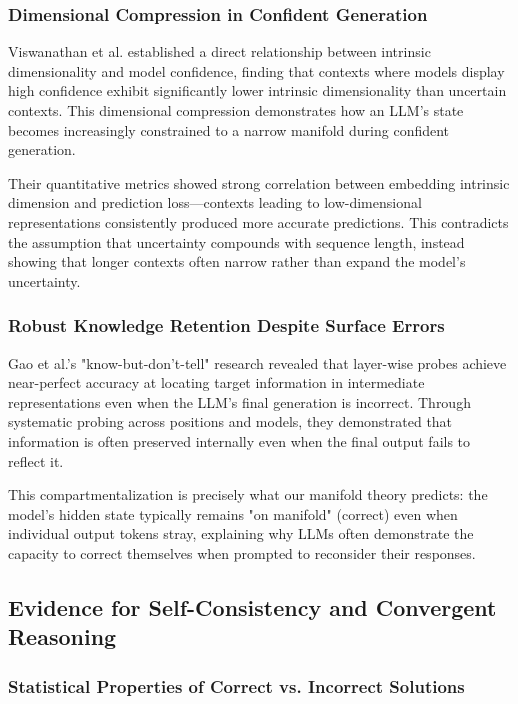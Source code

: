 \documentclass{article}
\begin{document}
\subsubsection{Dimensional Compression in Confident Generation}

Viswanathan et al. \citep{viswanathan2023geometry} established a direct relationship between intrinsic dimensionality and model confidence, finding that contexts where models display high confidence exhibit significantly lower intrinsic dimensionality than uncertain contexts. This dimensional compression demonstrates how an LLM's state becomes increasingly constrained to a narrow manifold during confident generation.

Their quantitative metrics showed strong correlation between embedding intrinsic dimension and prediction loss—contexts leading to low-dimensional representations consistently produced more accurate predictions. This contradicts the assumption that uncertainty compounds with sequence length, instead showing that longer contexts often narrow rather than expand the model's uncertainty.

\subsubsection{Robust Knowledge Retention Despite Surface Errors}

Gao et al.'s \citep{gao2024insights} "know-but-don't-tell" research revealed that layer-wise probes achieve near-perfect accuracy at locating target information in intermediate representations even when the LLM's final generation is incorrect. Through systematic probing across positions and models, they demonstrated that information is often preserved internally even when the final output fails to reflect it.

This compartmentalization is precisely what our manifold theory predicts: the model's hidden state typically remains "on manifold" (correct) even when individual output tokens stray, explaining why LLMs often demonstrate the capacity to correct themselves when prompted to reconsider their responses.

\subsection{Evidence for Self-Consistency and Convergent Reasoning}

\subsubsection{Statistical Properties of Correct vs. Incorrect Solutions}
\end{document}
